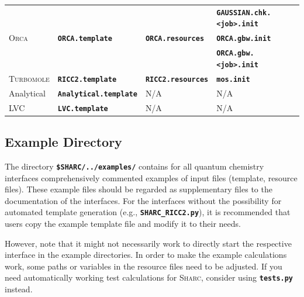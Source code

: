 \documentclass[a4paper,10pt,DIV=15,openany]{scrbook}
\newcommand{\sharc}{\textsc{Sharc}}
\newcommand{\ttt}[1]{\textbf{\texttt{#1}}}
\begin{document}
\begin{table}[htb]
\begin{tabular}{lllll}
                        &                          &                          &\ttt{GAUSSIAN.chk.<job>.init}   &\\
    \textsc{Orca}       &\ttt{ORCA.template}       &\ttt{ORCA.resources}      &\ttt{ORCA.gbw.init}             &\\
                        &                          &                          &\ttt{ORCA.gbw.<job>.init}       &\\
    \textsc{Turbomole}  &\ttt{RICC2.template}      &\ttt{RICC2.resources}     &\ttt{mos.init}                  &\\
    Analytical          &\ttt{Analytical.template} &N/A                       &N/A                             &\\
    LVC                 &\ttt{LVC.template}        &N/A                       &N/A                             &\\
    \hline
  \end{tabular}
\end{table}


\subsection{Example Directory}


The directory \ttt{\$SHARC/../examples/} contains for all quantum chemistry interfaces comprehensively commented examples of input files (template, resource files).
These example files should be regarded as supplementary files to the documentation of the interfaces.
For the interfaces without the possibility for automated template generation (e.g., \ttt{SHARC\_RICC2.py}), it is recommended that users copy the example template file and modify it to their needs.

However, note that it might not necessarily work to directly start the respective interface in the example directories.
In order to make the example calculations work,  some paths or variables in the resource files need to be adjusted.
If you need automatically working test calculations for \sharc, consider using \ttt{tests.py} instead.
\end{document}
